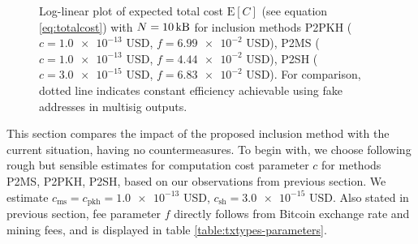 \documentclass[a4paper,11pt,titlepage]{scrbook}
\begin{document}
\begin{figure}[tb]
    \centering
    \caption[Log-linear plot of expected total cost]{Log-linear plot of expected total cost $\mathrm{E}[C]$ (see equation \ref{eq:totalcost}) with $N=\protect\SI{10}{\kilo\byte}$ for inclusion methods P2PKH ($c=\num{1.0e-13}$ USD, $f=\num{6.99e-2}$ USD), P2MS ($c=\num{1.0e-13}$ USD, $f=\num{4.44e-2}$ USD), P2SH ($c=\num{3.0e-15}$ USD, $f=\num{6.83e-2}$ USD). For comparison, dotted line indicates constant efficiency achievable using fake addresses in multisig outputs.}
    \label{fig:plot}
\end{figure}

This section compares the impact of the proposed inclusion method with the current situation, having no countermeasures.
To begin with, we choose following rough but sensible estimates for computation cost parameter $c$ for methods P2MS, P2PKH, P2SH, based on our observations from previous section.
We estimate $c_\text{ms}=c_\text{pkh}=\num{1.0e-13}$ USD, $c_\text{sh} = \num{3.0e-15}$ USD.
Also stated in previous section, fee parameter $f$ directly follows from Bitcoin exchange rate and mining fees, and is displayed in table \ref{table:txtypes-parameters}.
\end{document}
